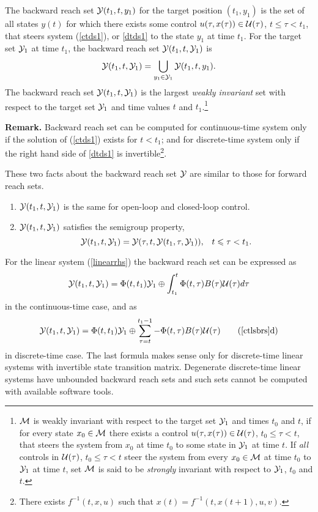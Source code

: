 The backward reach set $\YY(t_1, t, y_1)$ for the target position
$(t_1, y_1)$ is the set of all states $y(t)$ for which there exists
some control $u(\tau, x(\tau))\in\UU(\tau)$, $t\leq\tau<t_1$,
that steers system (\ref{ctds1}), or \ref{dtds1}
to the state $y_1$ at time $t_1$.
For the target set $\YY_1$ at time $t_1$, the backward reach set $\YY(t_1, t, \YY_1)$ is
\[ \YY(t_1, t, \YY_1) = \bigcup_{y_1\in\YY_1}\YY(t_1, t, y_1). \]
\label{def_olbrs}
\ed
The backward reach set $\YY(t_1, t, \YY_1)$ is the largest \emph{weakly invariant}
set with respect to the target set $\YY_1$ and time values $t$ and
$t_1$.\footnote{$\MM$ is weakly invariant with respect to
the target set $\YY_1$ and times $t_0$ and $t$, if for every state $x_0\in\MM$
there exists a control $u(\tau, x(\tau))\in\UU(\tau)$, $t_0\leq\tau< t$, that
steers the system from $x_0$ at time $t_0$ to some state in $\YY_1$ at time $t$.
If \emph{all} controls in $\UU(\tau)$, $t_0\leq\tau<t$ steer the system
from every $x_0\in\MM$ at time $t_0$ to $\YY_1$ at time $t$,
set $\MM$ is said to be
\emph{strongly} invariant with respect to $\YY_1$, $t_0$ and $t$.}

{\bf Remark.}
Backward reach set can be computed for continuous-time system only if
the solution of (\ref{ctds1}) exists for $t<t_1$; and for discrete-time
system only if the right hand side of \ref{dtds1}
is invertible\footnote{There exists $f^{-1}(t,x,u)$ such that
$x(t)=f^{-1}(t, x(t+1), u, v)$.}.  

These two facts about
the backward reach set $\YY$ are similar to those for forward reach sets.
\begin{enumerate}
\item $\YY(t_1, t, \YY_1)$ is the same for open-loop
and closed-loop control.

\item $\YY(t_1, t, \YY_1)$ satisfies the semigroup property,
\begin{equation}
\YY(t_1, t, \YY_1) = \YY(\tau, t, \YY(t_1, \tau, \YY_1)), \;\;\;
t\leq \tau< t_1.
\label{semigroup_b}
\end{equation}
\end{enumerate}
For the linear system (\ref{linearrhs}) the backward reach set
can be expressed as
\begin{equation}
\YY(t_1, t, \YY_1) =
\Phi(t, t_1)\YY_1 \oplus \int_{t_1}^t\Phi(t, \tau)B(\tau)\UU(\tau)d\tau
\label{ctlsbrs}
\end{equation}
in the continuous-time case, and as
\begin{equation}
\YY(t_1, t, \YY_1) =
\Phi(t, t_1)\YY_1 \oplus \sum_{\tau =t}^{t_1-1}-\Phi(t, \tau)B(\tau)\UU(\tau)
\tag*{(\ref{ctlsbrs}d)}
\label{dtlsbrs}
\end{equation}
in discrete-time case.
The last formula makes sense only for discrete-time linear systems with
invertible state transition matrix.
Degenerate discrete-time linear systems have unbounded backward reach sets and such sets
cannot be computed with available software tools.

